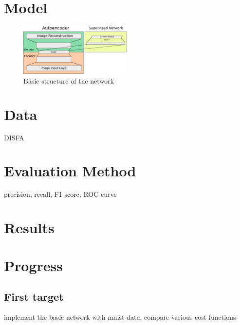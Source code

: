 \documentclass[11pt]{article}
\begin{document}
\section{Model}
\begin{figure}
  \begin{center}
    \includegraphics[width=0.5\textwidth]{illustrations/network_01.pdf}
  \end{center}
  \caption{Basic structure of the network}
\end{figure}
\section{Data}
DISFA
\section{Evaluation Method}
precision, recall, F1 score, ROC curve
\section{Results}
\section{Progress}
\subsection{First target}
implement the basic network with mnist data, compare various cost functions



\end{document}
